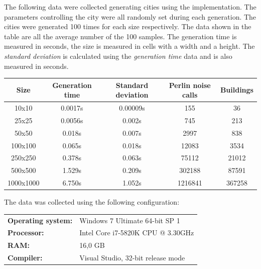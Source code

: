 	The following data were collected generating cities using the implementation. The parameters controlling the city were all randomly set during each generation. The cities were generated 100 times for each size respectively. The data shown in the table are all the average number of the 100 samples. The generation time is measured in seconds, the size is measured in cells with a width and a height.
	The \textit{standard deviation} is calculated using the \textit{generation time} data and is also measured in seconds.
	
	\begin{center}
		\begin{tabular}{|c | c c c c|} 
			\hline
			Size & Generation time & Standard deviation & Perlin noise calls & Buildings \\ [0.9ex] 
			\hline\hline
			10x10 & 0.0017s & 0.00009s & 155 & 36 \\ 
			\hline
			25x25 & 0.0056s & 0.002s & 745 & 213 \\
			\hline
			50x50 & 0.018s & 0.007s & 2997 & 838 \\
			\hline
			100x100 & 0.065s & 0.018s & 12083 & 3534 \\
			\hline
			250x250 & 0.378s & 0.063s & 75112 & 21012 \\
			\hline
			500x500 & 1.529s & 0.209s & 302188 & 87591 \\
			\hline
			1000x1000 & 6.750s & 1.052s & 1216841 & 367258 \\ [2ex] 
			\hline
		\end{tabular}
	\end{center}
	
	\begin{flushleft}
	The data was collected using the following configuration: \\
	\end{flushleft}
	\begin{tabular}{l l}
		\textbf{Operating system:} & Windows 7 Ultimate 64-bit SP 1 \\
		\textbf{Processor:} & Intel Core i7-5820K CPU @ 3.30GHz \\
		\textbf{RAM:} & 16,0 GB \\
		\textbf{Compiler:} & Visual Studio, 32-bit release mode \\
	\end{tabular}
	
